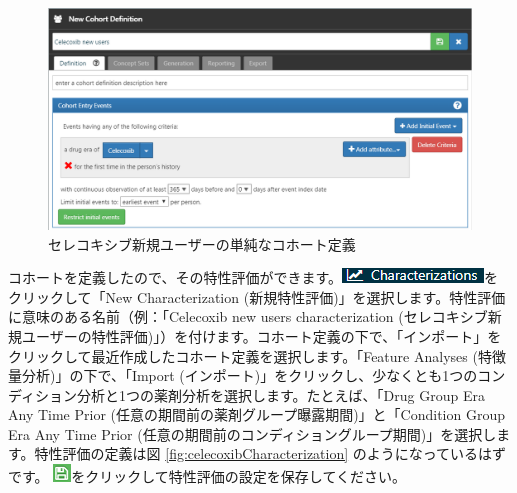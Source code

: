 \documentclass[
  11pt]{book}
\theoremstyle{definition}
\theoremstyle{definition}
\theoremstyle{definition}
\theoremstyle{definition}
\theoremstyle{remark}
\begin{document}
\begin{figure}

{\centering \includegraphics[width=1\linewidth]{images/SuggestedAnswers/celecoxibCohortDefinition} 

}

\caption{セレコキシブ新規ユーザーの単純なコホート定義}\label{fig:celecoxibCohortDefinition}
\end{figure}

コホートを定義したので、その特性評価ができます。\includegraphics{images/Characterization/atlasCharacterizationMenuItem.png}をクリックして「New Characterization (新規特性評価)」を選択します。特性評価に意味のある名前（例：「Celecoxib new users characterization (セレコキシブ新規ユーザーの特性評価)」）を付けます。コホート定義の下で、「インポート」をクリックして最近作成したコホート定義を選択します。「Feature Analyses (特徴量分析)」の下で、「Import (インポート)」をクリックし、少なくとも1つのコンディション分析と1つの薬剤分析を選択します。たとえば、「Drug Group Era Any Time Prior (任意の期間前の薬剤グループ曝露期間)」と「Condition Group Era Any Time Prior (任意の期間前のコンディショングループ期間)」を選択します。特性評価の定義は図 \ref{fig:celecoxibCharacterization} のようになっているはずです。 \includegraphics{images/Cohorts/save.png}をクリックして特性評価の設定を保存してください。
\end{document}
